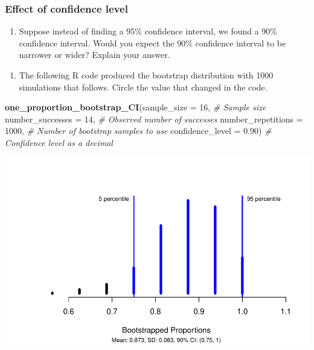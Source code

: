 \documentclass[
]{report}
\newenvironment{Shaded}{\begin{snugshade}}{\end{snugshade}}
\newcommand{\AttributeTok}[1]{\textcolor[rgb]{0.13,0.29,0.53}{#1}}
\newcommand{\CommentTok}[1]{\textcolor[rgb]{0.56,0.35,0.01}{\textit{#1}}}
\newcommand{\DecValTok}[1]{\textcolor[rgb]{0.00,0.00,0.81}{#1}}
\newcommand{\FloatTok}[1]{\textcolor[rgb]{0.00,0.00,0.81}{#1}}
\newcommand{\FunctionTok}[1]{\textcolor[rgb]{0.13,0.29,0.53}{\textbf{#1}}}
\newcommand{\NormalTok}[1]{#1}
\providecommand{\tightlist}{%
  \setlength{\itemsep}{0pt}\setlength{\parskip}{0pt}}
\begin{document}
\vspace{0.5in}

\subsubsection*{Effect of confidence level}\label{effect-of-confidence-level}

\begin{enumerate}
\def\labelenumi{\arabic{enumi}.}
\setcounter{enumi}{13}
\tightlist
\item
  Suppose instead of finding a 95\% confidence interval, we found a 90\% confidence interval. Would you expect the 90\% confidence interval to be narrower or wider? Explain your answer.
\end{enumerate}

\vspace{0.4in}

\begin{enumerate}
\def\labelenumi{\arabic{enumi}.}
\setcounter{enumi}{14}
\tightlist
\item
  The following R code produced the bootstrap distribution with 1000 simulations that follows. Circle the value that changed in the code.
\end{enumerate}

\begin{Shaded}
\begin{Highlighting}[]
\FunctionTok{one\_proportion\_bootstrap\_CI}\NormalTok{(}\AttributeTok{sample\_size =} \DecValTok{16}\NormalTok{, }\CommentTok{\# Sample size}
                    \AttributeTok{number\_successes =} \DecValTok{14}\NormalTok{, }\CommentTok{\# Observed number of successes}
                    \AttributeTok{number\_repetitions =} \DecValTok{1000}\NormalTok{, }\CommentTok{\# Number of bootstrap samples to use}
                    \AttributeTok{confidence\_level =} \FloatTok{0.90}\NormalTok{) }\CommentTok{\# Confidence level as a decimal}
\end{Highlighting}
\end{Shaded}

\begin{center}\includegraphics[width=0.7\linewidth]{03-A08-inference-1cat_CI-simulation_files/figure-latex/unnamed-chunk-2-1} \end{center}
\end{document}
